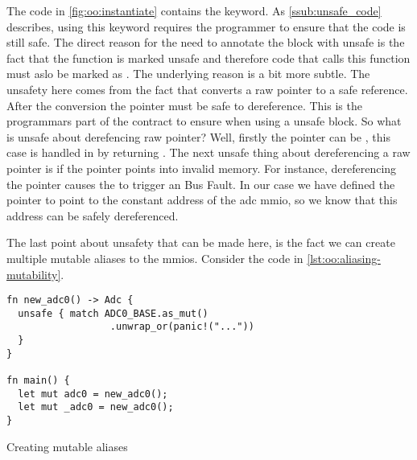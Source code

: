 The {\rust} code in \autoref{fig:oo:instantiate} contains the {\unsafe} keyword.
As \autoref{ssub:unsafe_code} describes, using this keyword requires the programmer to ensure that the code is still safe.
The direct reason for the need to annotate the block with unsafe is the fact that the function  is marked unsafe and therefore code that calls this function must aslo be marked as .
The underlying reason is a bit more subtle.
The unsafety here comes from the fact that  converts a raw pointer to a safe reference.
After the conversion the pointer must be safe to dereference.
This is the programmars part of the contract to ensure when using a unsafe block.
So what is unsafe about derefencing raw pointer?
Well, firstly the pointer can be , this case is handled in  by returning .
The next unsafe thing about dereferencing a raw pointer is if the pointer points into invalid memory.
For instance, dereferencing the pointer  causes the {\gecko} to trigger an Bus Fault.
In our case we have defined the pointer to point to the constant address of the \gls{adc} \gls{mmio}, so we know that this address can be safely dereferenced.

The last point about unsafety that can be made here, is the fact we can create multiple mutable aliases to the \glspl{mmio}.
Consider the code in \autoref{lst:oo:aliasing-mutability}.

\begin{listing}[H]
  \begin{verbatim}
fn new_adc0() -> Adc {
  unsafe { match ADC0_BASE.as_mut()
                  .unwrap_or(panic!("..."))
  }
}

fn main() {
  let mut adc0 = new_adc0();
  let mut _adc0 = new_adc0();
}
  \end{verbatim}
  \caption{Creating mutable aliases}
  \label{lst:oo:aliasing-mutability}
\end{listing}
